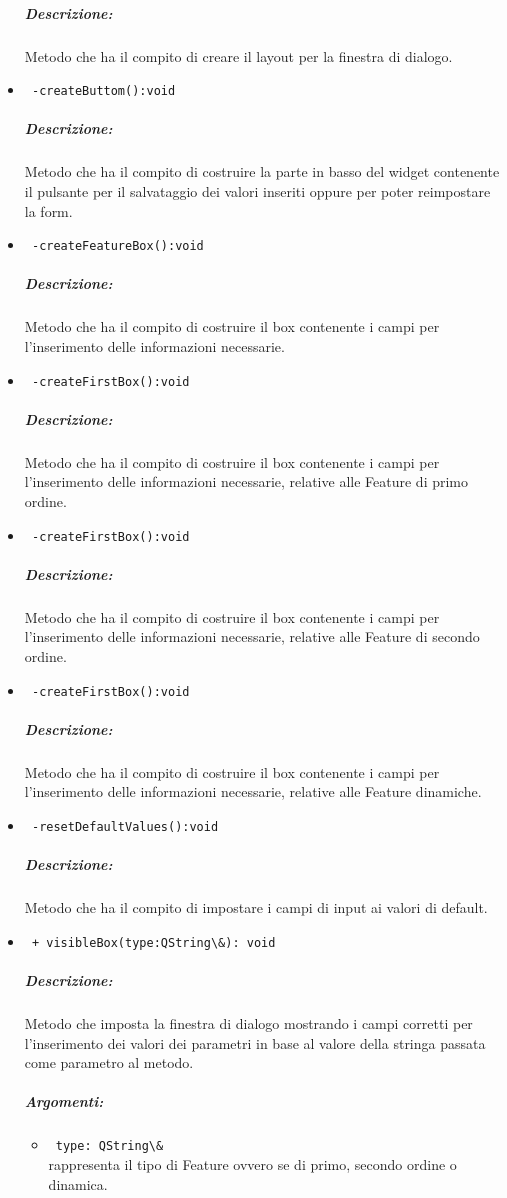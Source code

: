 \begin{itemize}
\color{black}
\subparagraph{Descrizione:} Metodo che ha il compito di creare il layout per la finestra di dialogo.
 
\item \color{blue}\verb! -createButtom():void!
\color{black}
\subparagraph{Descrizione:} Metodo che ha il compito di costruire la parte in basso del widget contenente il pulsante per il salvataggio dei valori inseriti oppure per poter reimpostare la form.

\item \color{blue}\verb! -createFeatureBox():void!
\color{black}
\subparagraph{Descrizione: }Metodo che ha il compito di costruire il box contenente i campi per l'inserimento delle informazioni necessarie.

\item \color{blue}\verb! -createFirstBox():void!
\color{black}
\subparagraph{Descrizione: }Metodo che ha il compito di costruire il box contenente i campi per l'inserimento delle informazioni necessarie, relative alle Feature\g{} di primo ordine.

\item \color{blue}\verb! -createFirstBox():void!
\color{black}
\subparagraph{Descrizione:} Metodo che ha il compito di costruire il box contenente i campi per l'inserimento delle informazioni necessarie, relative alle Feature\g{} di secondo ordine.

\item \color{blue}\verb! -createFirstBox():void!
\color{black}
\subparagraph{Descrizione:}
 Metodo che ha il compito di costruire il box contenente i campi per l'inserimento delle informazioni necessarie, relative alle Feature\g{} dinamiche.
 
\item \color{blue}\verb! -resetDefaultValues():void!
\color{black}
\subparagraph{Descrizione:}
 Metodo che ha il compito di impostare i campi di input ai valori di default.
 
\item \color{blue}\verb! + visibleBox(type:QString\&): void!
\color{black}
\subparagraph{Descrizione:} Metodo che imposta la finestra di dialogo mostrando i campi corretti per l'inserimento dei valori dei parametri in base al valore della stringa passata come parametro al metodo.\\
\subparagraph{Argomenti:}
\begin{itemize}
\item \color{RoyalPurple} \verb! type: QString\& ! \\ rappresenta il tipo di Feature\g{} ovvero se di primo, secondo ordine o dinamica.
\end{itemize}


\end{itemize}
